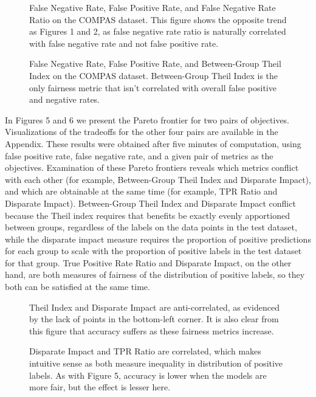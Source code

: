 \documentclass[twoside]{article}
\newcommand{\figures}[4]{
	\begin{figure}[H]{
		\centering{
			\texttt{[image: \#1]}
		}
		\caption{#2}
		}
	\end{figure}
	\begin{figure}[H] {
		\centering{
			\texttt{[image: \#3]}
		}
		\caption{#4}
	}
	\end{figure}
}
\begin{document}
\figures{FNR Ratio|COMPAS.png}{False Negative Rate, False Positive Rate, and False Negative Rate Ratio on the COMPAS dataset. This figure shows the opposite trend as Figures 1 and 2, as false negative rate ratio is naturally correlated with false negative rate and not false positive rate.}{Between-Group Theil Index|COMPAS.png}{False Negative Rate, False Positive Rate, and Between-Group Theil Index on the COMPAS dataset. Between-Group Theil Index is the only fairness metric that isn't correlated with overall false positive and negative rates.}

In Figures 5 and 6 we present the Pareto frontier for two pairs of objectives. Visualizations of the tradeoffs for the other four pairs are available in the Appendix. These results were obtained after five minutes of computation, using false positive rate, false negative rate, and a given pair of metrics as the objectives. Examination of these Pareto frontiers reveals which metrics conflict with each other (for example, Between-Group Theil Index and Disparate Impact), and which are obtainable at the same time (for example, TPR Ratio and Disparate Impact). Between-Group Theil Index and Disparate Impact conflict because the Theil index requires that benefits be exactly evenly apportioned between groups, regardless of the labels on the data points in the test dataset, while the disparate impact measure requires the proportion of positive predictions for each group to scale with the proportion of positive labels in the test dataset for that group. True Positive Rate Ratio and Disparate Impact, on the other hand, are both measures of fairness of the distribution of positive labels, so they both can be satisfied at the same time. 

\figures{Between-Group Theil Index|Disparate Impact|COMPAS.png}{Theil Index and Disparate Impact are anti-correlated, as evidenced by the lack of points in the bottom-left corner. It is also clear from this figure that accuracy suffers as these fairness metrics increase.}{TPR Ratio|Disparate Impact|COMPAS.png}{Disparate Impact and TPR Ratio are correlated, which makes intuitive sense as both measure inequality in distribution of positive labels. As with Figure 5, accuracy is lower when the models are more fair, but the effect is lesser here.}
\end{document}
